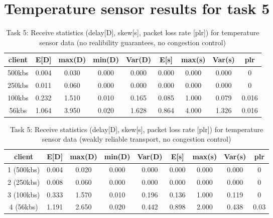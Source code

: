 \chapter{Temperature sensor results for task 5}
\label{appendix:task5}
\begin{table}
\centering
\begin{tabular}{|c|c|c|c|c|c|c|c|c|}
\hline
client & E[D] & max(D) & min(D) & Var(D) & E[s] & max(s) & Var(s) & plr\\
\hline
500kbs & 0.004 & 0.030 & 0.000 & 0.000 & 0.000 & 0.000 &  0.000  & 0\\
\hline
250kbs & 0.011 & 0.060 & 0.000 & 0.000 & 0.000 & 0.000 &  0.000 & 0\\
\hline
100kbs & 0.232 & 1.510 & 0.010 & 0.165 & 0.085 & 1.000 &  0.079 & 0.016\\
\hline
56kbs & 1.064 & 3.950 & 0.020 & 1.628 & 0.864 & 4.000 &  1.326 & 0.016 \\
\hline
\end{tabular}
\caption{Task 5: Receive statistics (delay[D], skew[s], packet loss rate [plr]) for temperature sensor data (no realibility guarantees, no congestion control)}
\label{table:task5-temp-a}
\end{table}



\begin{table}
\centering
\begin{tabular}{|c|c|c|c|c|c|c|c|c|}
\hline
client & E[D] & max(D) & min(D) & Var(D) & E[s] & max(s) & Var(s) & plr\\
\hline
1 (500kbs) & 0.004 & 0.020 & 0.000 & 0.000 & 0.000 & 0.000 & 0.000 & 0 \\
\hline
2 (250kbs) & 0.008 & 0.060 & 0.000 & 0.000 & 0.000 & 0.000 & 0.000 & 0\\
\hline
3 (100kbs) & 0.333 & 1.570 & 0.010 & 0.196 & 0.136 & 1.000 & 0.119 & 0\\
\hline
4 (56kbs) & 1.191 & 2.650 & 0.020 & 0.442 & 0.898 & 2.000 &  0.438 & 0.03\\
\hline
\end{tabular}
\caption{Task 5: Receive statistics (delay[D], skew[s], packet loss rate [plr]) for temperature sensor data (weakly reliable transport, no congestion control) }
\label{table:task5-camera-c}
\end{table}

